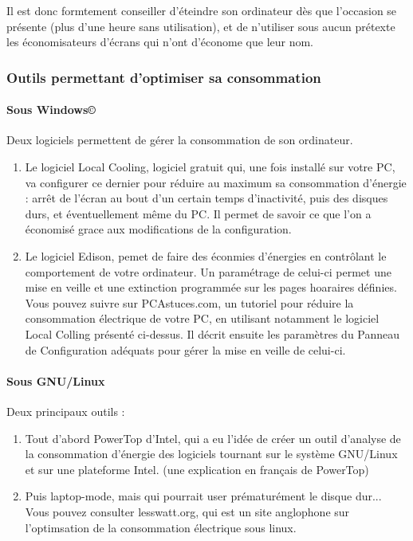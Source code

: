 \documentclass[a4paper,11pt,french]{article}
\begin{document}
Il est donc formtement conseiller d'éteindre son ordinateur dès que l'occasion se présente (plus d'une heure sans utilisation), et de n'utiliser sous aucun prétexte les économisateurs d'écrans qui n'ont d'économe que leur nom.



\subsubsection{Outils permettant d'optimiser sa consommation}
\paragraph{Sous Windows\copyright}

Deux logiciels permettent de gérer la consommation de son ordinateur.
\begin{enumerate}
\item Le logiciel Local Cooling, logiciel gratuit qui, une fois installé sur votre PC, va configurer ce dernier pour réduire au maximum sa consommation d'énergie : arrêt de l'écran au bout d'un certain temps d'inactivité, puis des disques durs, et éventuellement même du PC. Il permet de savoir ce que l'on a économisé grace aux modifications de la configuration.
\item Le logiciel Edison, pemet de faire des éconmies d'énergies en contrôlant le comportement de votre ordinateur. Un paramétrage de celui-ci permet une mise en veille et une extinction programmée sur les pages hoaraires définies.
Vous pouvez suivre sur PCAstuces.com, un tutoriel pour réduire la consommation électrique de votre PC, en utilisant notamment le logiciel Local Colling présenté ci-dessus. Il décrit ensuite les paramètres du Panneau de Configuration adéquats pour gérer la mise en veille de celui-ci.
\end{enumerate}

\paragraph{Sous GNU/Linux}
Deux principaux outils :

\begin{enumerate}
\item Tout d'abord PowerTop d'Intel, qui a eu l'idée de créer un outil d'analyse de la consommation d'énergie des logiciels tournant sur le système GNU/Linux et sur une plateforme Intel. (une explication en français de PowerTop)
\item Puis laptop-mode, mais qui pourrait user prématurément le disque dur...
Vous pouvez consulter lesswatt.org, qui est un site anglophone sur l'optimsation de la consommation électrique sous linux.
\end{enumerate}
\end{document}
